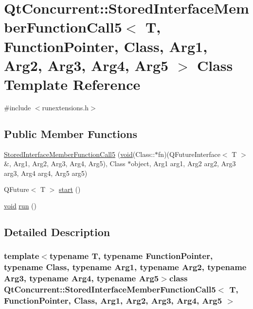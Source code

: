 \hypertarget{class_qt_concurrent_1_1_stored_interface_member_function_call5}{\section{\-Qt\-Concurrent\-:\-:\-Stored\-Interface\-Member\-Function\-Call5$<$ \-T, \-Function\-Pointer, \-Class, \-Arg1, \-Arg2, \-Arg3, \-Arg4, \-Arg5 $>$ \-Class \-Template \-Reference}
\label{class_qt_concurrent_1_1_stored_interface_member_function_call5}
}


{\ttfamily \#include $<$runextensions.\-h$>$}

\subsection*{\-Public \-Member \-Functions}
\begin{DoxyCompactItemize}
\item 
\hyperlink{class_qt_concurrent_1_1_stored_interface_member_function_call5_aa9068fc355a02ff4a4d4ac9f72644d60}{\-Stored\-Interface\-Member\-Function\-Call5} (\hyperlink{group___u_a_v_objects_plugin_ga444cf2ff3f0ecbe028adce838d373f5c}{void}(\-Class\-::$\ast$fn)(\-Q\-Future\-Interface$<$ \-T $>$ \&, \-Arg1, \-Arg2, \-Arg3, \-Arg4, \-Arg5), \-Class $\ast$object, \-Arg1 arg1, \-Arg2 arg2, \-Arg3 arg3, \-Arg4 arg4, \-Arg5 arg5)
\item 
\-Q\-Future$<$ \-T $>$ \hyperlink{class_qt_concurrent_1_1_stored_interface_member_function_call5_a7f9d0a08cd8d984e8751f4146e0ea44c}{start} ()
\item 
\hyperlink{group___u_a_v_objects_plugin_ga444cf2ff3f0ecbe028adce838d373f5c}{void} \hyperlink{class_qt_concurrent_1_1_stored_interface_member_function_call5_a6eecfe6d0aad4cfa06c09882b83c04a4}{run} ()
\end{DoxyCompactItemize}


\subsection{\-Detailed \-Description}
\subsubsection*{template$<$typename T, typename Function\-Pointer, typename Class, typename Arg1, typename Arg2, typename Arg3, typename Arg4, typename Arg5$>$class Qt\-Concurrent\-::\-Stored\-Interface\-Member\-Function\-Call5$<$ T, Function\-Pointer, Class, Arg1, Arg2, Arg3, Arg4, Arg5 $>$}



